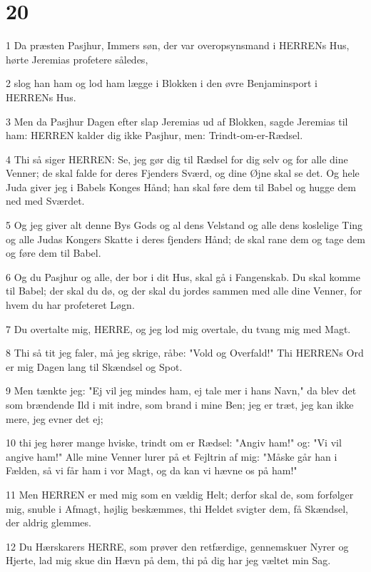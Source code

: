 \chapter{20}

\par 1 Da præsten Pasjhur, Immers søn, der var overopsynsmand i HERRENs Hus, hørte Jeremias profetere således,
\par 2 slog han ham og lod ham lægge i Blokken i den øvre Benjaminsport i HERRENs Hus.
\par 3 Men da Pasjhur Dagen efter slap Jeremias ud af Blokken, sagde Jeremias til ham: HERREN kalder dig ikke Pasjhur, men: Trindt-om-er-Rædsel.
\par 4 Thi så siger HERREN: Se, jeg gør dig til Rædsel for dig selv og for alle dine Venner; de skal falde for deres Fjenders Sværd, og dine Øjne skal se det. Og hele Juda giver jeg i Babels Konges Hånd; han skal føre dem til Babel og hugge dem ned med Sværdet.
\par 5 Og jeg giver alt denne Bys Gods og al dens Velstand og alle dens koslelige Ting og alle Judas Kongers Skatte i deres fjenders Hånd; de skal rane dem og tage dem og føre dem til Babel.
\par 6 Og du Pasjhur og alle, der bor i dit Hus, skal gå i Fangenskab. Du skal komme til Babel; der skal du dø, og der skal du jordes sammen med alle dine Venner, for hvem du har profeteret Løgn.
\par 7 Du overtalte mig, HERRE, og jeg lod mig overtale, du tvang mig med Magt.
\par 8 Thi så tit jeg faler, må jeg skrige, råbe: "Vold og Overfald!" Thi HERRENs Ord er mig Dagen lang til Skændsel og Spot.
\par 9 Men tænkte jeg: "Ej vil jeg mindes ham, ej tale mer i hans Navn," da blev det som brændende Ild i mit indre, som brand i mine Ben; jeg er træt, jeg kan ikke mere, jeg evner det ej;
\par 10 thi jeg hører mange hviske, trindt om er Rædsel: "Angiv ham!" og: "Vi vil angive ham!" Alle mine Venner lurer på et Fejltrin af mig: "Måske går han i Fælden, så vi får ham i vor Magt, og da kan vi hævne os på ham!"
\par 11 Men HERREN er med mig som en vældig Helt; derfor skal de, som forfølger mig, snuble i Afmagt, højlig beskæmmes, thi Heldet svigter dem, få Skændsel, der aldrig glemmes.
\par 12 Du Hærskarers HERRE, som prøver den retfærdige, gennemskuer Nyrer og Hjerte, lad mig skue din Hævn på dem, thi på dig har jeg væltet min Sag.
